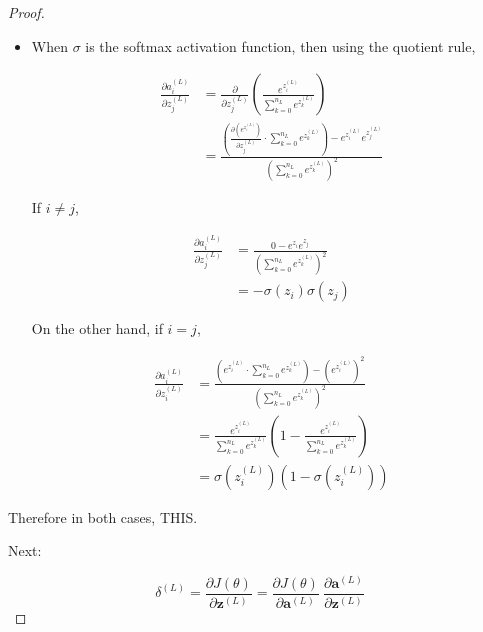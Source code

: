 \documentclass{article}
\begin{document}
\begin{proof}
\begin{itemize}
            
            
                \item When $\sigma$ is the softmax activation function, then using the quotient rule,
                
                $$ \begin{aligned}
                \frac{\partial a^{(L)}_i}{\partial z^{(L)}_j}
                &= \frac{\partial}{\partial z^{(L)}_j} \left( \frac{e^{z^{(L)}_i}}{\sum_{k=0}^{n_L} e^{z^{(L)}_k}} \right) \\
                &= \frac{\left( \frac{\partial \left( e^{z^{(L)}_i}\right)}{\partial z^{(L)}_j} \cdot \sum_{k=0}^{n_L} e^{z^{(L)}_k} \right) - e^{z^{(L)}_i} e^{z^{(L)}_j}}{\left( \sum_{k=0}^{n_L} e^{z^{(L)}_k} \right)^2}
                \end{aligned} $$
                
                
                If $i \neq j$,
               
                $$ \begin{aligned}
                \frac{\partial a^{(L)}_i}{\partial z^{(L)}_j}
                &= \frac{0 - e^{z_i} e^{z_j}}{\left( \sum_{k=0}^{n_L} e^{z^{(L)}_k} \right)^2} \\
                &= - \sigma(z_i) \sigma(z_j)
                \end{aligned} $$
                
                On the other hand, if $i = j$,
                
                $$ \begin{aligned}
                \frac{\partial a^{(L)}_i}{\partial z^{(L)}_i}
                &= \frac{\left( e^{z^{(L)}_i} \cdot \sum_{k=0}^{n_L} e^{z^{(L)}_k} \right) - \left( e^{z^{(L)}_i} \right)^2}{\left( \sum_{k=0}^{n_L} e^{z^{(L)}_k} \right)^2} \\
                &= \frac{e^{z^{(L)}_i}}{\sum_{k=0}^{n_L} e^{z^{(L)}_k}} \left( 1 - \frac{e^{z^{(L)}_i}}{\sum_{k=0}^{n_L} e^{z^{(L)}_k}} \right) \\
                &= \sigma(z^{(L)}_i) \left( 1 - \sigma(z^{(L)}_i) \right)
                \end{aligned} $$
                
            \end{itemize}
            
            Therefore in both cases, THIS.
            
            Next:
            
            $$
            \delta^{(L)} =
            \frac{\partial J(\theta)}{\partial \mathbf{z}^{(L)}} =
            \frac{\partial J(\theta)}{\partial \mathbf{a}^{(L)}} \ \frac{\partial \mathbf{a}^{(L)}}{\partial \mathbf{z}^{(L)}}
            $$
            
    
    
    
        \end{proof}
\end{document}
